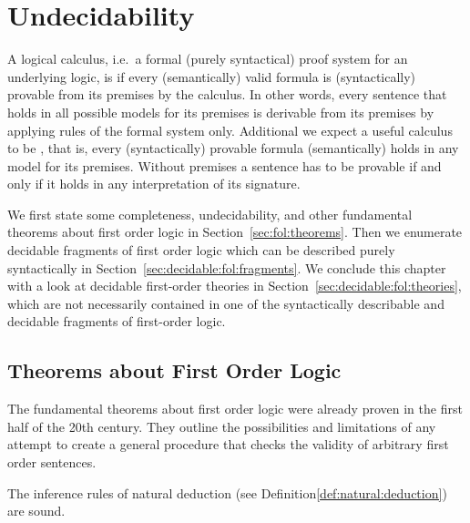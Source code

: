 

\chapter{Undecidability}

A logical calculus, i.e.~a formal (purely syntactical) proof system for an underlying logic,
is  if every (semantically) valid formula is (syntactically) provable from its premises by the calculus.
In other words, every sentence that holds in all possible models for its premises
is derivable from its premises by applying rules of the formal system only.
Additional we expect a useful calculus to be , that is,
every (syntactically) provable formula (semantically) holds in any model for its premises.
Without premises a sentence has to be provable if and only if it holds in any interpretation of its signature.




We first state some completeness, undecidability, and other
fundamental theorems about first order logic
in Section~\vref{sec:fol:theorems}.
Then we enumerate decidable fragments of first order logic
which can be described purely syntactically
in Section~\vref{sec:decidable:fol:fragments}.
We conclude this chapter with a look at decidable first-order theories
in Section~\vref{sec:decidable:fol:theories},
which are not necessarily contained
in one of the syntactically describable and decidable fragments of first-order logic.


\section{Theorems about First Order Logic}\label{sec:fol:theorems}

The fundamental theorems about first order logic
were already proven in the first half of the 20th century.
They outline the possibilities and limitations of any attempt
to create a general procedure that checks the validity of arbitrary first order sentences.

\begin{theorem}[Soundness]
	The inference rules of natural deduction (see Definition\vref{def:natural:deduction}) are sound.
\end{theorem}

